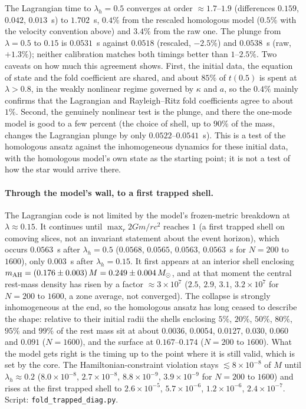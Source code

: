 \documentclass[11pt]{article}
\begin{document}
The Lagrangian time to $\lambda_h=0.5$ converges at order $\approx1.7$--$1.9$ (differences $0.159$, $0.042$, $0.013$~s) to $1.702$~s, $0.4\%$ from the rescaled homologous model ($0.5\%$ with the velocity convention above) and $3.4\%$ from the raw one. The plunge from $\lambda=0.5$ to $0.15$ is $0.0531$~s against $0.0518$ (rescaled, $-2.5\%$) and $0.0538$~s (raw, $+1.3\%$); neither calibration matches both timings better than $1$--$2.5\%$. Two caveats on how much this agreement shows. First, the initial data, the equation of state and the fold coefficient are shared, and about $85\%$ of $t(0.5)$ is spent at $\lambda>0.8$, in the weakly nonlinear regime governed by $\kappa$ and $a$, so the $0.4\%$ mainly confirms that the Lagrangian and Rayleigh--Ritz fold coefficients agree to about $1\%$. Second, the genuinely nonlinear test is the plunge, and there the one-mode model is good to a few percent (the choice of shell, up to $90\%$ of the mass, changes the Lagrangian plunge by only $0.0522$--$0.0541$~s). This is a test of the homologous ansatz against the inhomogeneous dynamics for these initial data, with the homologous model's own state as the starting point; it is not a test of how the star would arrive there.

\paragraph{Through the model's wall, to a first trapped shell.} The Lagrangian code is not limited by the model's frozen-metric breakdown at $\lambda\approx0.15$. It continues until $\max_r2Gm/rc^2$ reaches $1$ (a first trapped shell on comoving slices, not an invariant statement about the event horizon), which occurs $0.0563$~s after $\lambda_h=0.5$ ($0.0568$, $0.0565$, $0.0563$, $0.0563$~s for $N=200$ to $1600$), only $0.003$~s after $\lambda_h=0.15$. It first appears at an interior shell enclosing $m_{\rm AH}=(0.176\pm0.003)\,M=0.249\pm0.004\,M_\odot$, and at that moment the central rest-mass density has risen by a factor $\approx3\times10^{7}$ ($2.5$, $2.9$, $3.1$, $3.2\times10^{7}$ for $N=200$ to $1600$, a zone average, not converged). The collapse is strongly inhomogeneous at the end, so the homologous ansatz has long ceased to describe the shape: relative to their initial radii the shells enclosing $5\%$, $20\%$, $50\%$, $80\%$, $95\%$ and $99\%$ of the rest mass sit at about $0.0036$, $0.0054$, $0.0127$, $0.030$, $0.060$ and $0.091$ ($N=1600$), and the surface at $0.167$--$0.174$ ($N=200$ to $1600$). What the model gets right is the timing up to the point where it is still valid, which is set by the core. The Hamiltonian-constraint violation stays $\lesssim8\times10^{-8}$ of $M$ until $\lambda_h\approx0.2$ ($8.0\times10^{-8}$, $2.7\times10^{-8}$, $8.8\times10^{-9}$, $3.9\times10^{-9}$ for $N=200$ to $1600$) and rises at the first trapped shell to $2.6\times10^{-5}$, $5.7\times10^{-6}$, $1.2\times10^{-6}$, $2.4\times10^{-7}$. Script: \texttt{fold\_trapped\_diag.py}.
\end{document}
